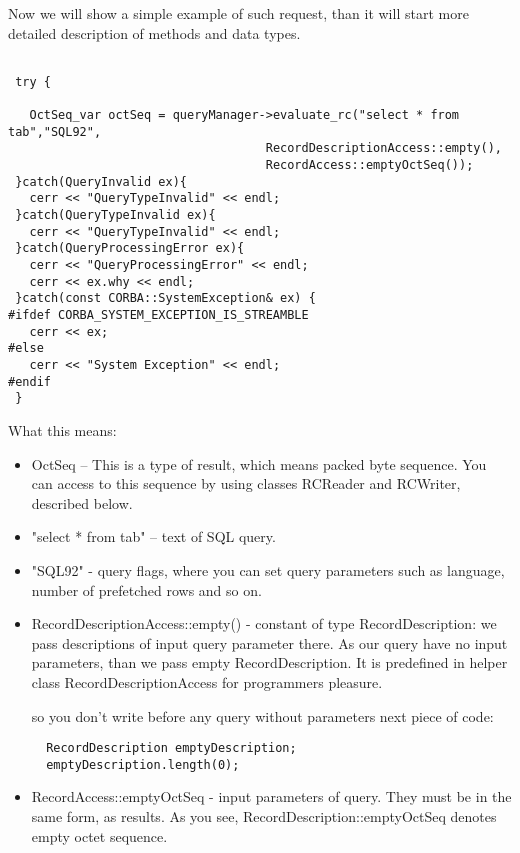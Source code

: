 \documentclass[10pt]{article}
\begin{document}
 Now we will show a simple example of such request, than it will start 
 more detailed description of methods and data types.

\begin{verbatim}

 try {

   OctSeq_var octSeq = queryManager->evaluate_rc("select * from tab","SQL92",
                                    RecordDescriptionAccess::empty(),
                                    RecordAccess::emptyOctSeq()); 
 }catch(QueryInvalid ex){
   cerr << "QueryTypeInvalid" << endl;
 }catch(QueryTypeInvalid ex){
   cerr << "QueryTypeInvalid" << endl;
 }catch(QueryProcessingError ex){
   cerr << "QueryProcessingError" << endl;
   cerr << ex.why << endl;
 }catch(const CORBA::SystemException& ex) {
#ifdef CORBA_SYSTEM_EXCEPTION_IS_STREAMBLE
   cerr << ex;
#else
   cerr << "System Exception" << endl;
#endif
 }

\end{verbatim}

 What this means:
 \begin{itemize}
  \item OctSeq -- This is a type of result, which means packed byte sequence.
  You can access to this sequence by using classes RCReader and RCWriter,
  described below.
  \item "select * from tab" -- text of SQL query.
  \item "SQL92" - query flags, where you can set query parameters such
  as language, number of prefetched rows and so on.
  \item RecordDescriptionAccess::empty() - constant of type RecordDescription:
   we pass descriptions of input query parameter there. As our query
   have no input parameters, than we pass empty RecordDescription.
   It is predefined in helper class RecordDescriptionAccess for 
   programmers pleasure.

\begin{footnote}
 so you don't write before any 
   query without parameters next piece of code:
\begin{verbatim}
  RecordDescription emptyDescription;
  emptyDescription.length(0);
\end{verbatim}
\end{footnote}

  \item RecordAccess::emptyOctSeq - input parameters of query. They must
  be in the same form, as results. As you see, RecordDescription::emptyOctSeq
  denotes empty octet sequence.

 \end{itemize}
\end{document}
